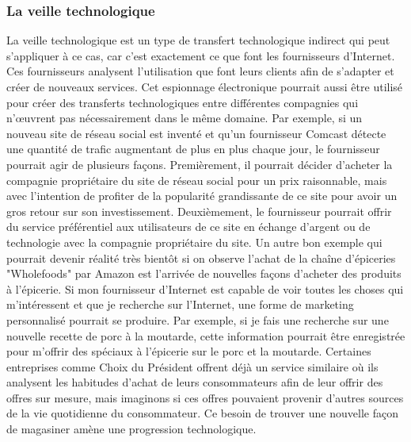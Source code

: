 \documentclass[12pt]{article}
\begin{document}
\subsubsection{La veille technologique}
La veille technologique est un type de transfert technologique indirect qui peut s’appliquer à ce cas, car c’est exactement ce que font les fournisseurs d’Internet. Ces fournisseurs analysent l’utilisation que font leurs clients afin de s’adapter et créer de nouveaux services. Cet espionnage électronique pourrait aussi être utilisé pour créer des transferts technologiques entre différentes compagnies qui n’œuvrent pas nécessairement dans le même domaine. Par exemple, si un nouveau site de réseau social est inventé et qu’un fournisseur Comcast détecte une quantité de trafic augmentant de plus en plus chaque jour, le fournisseur pourrait agir de plusieurs façons. Premièrement, il pourrait décider d’acheter la compagnie propriétaire du site de réseau social pour un prix raisonnable, mais avec l’intention de profiter de la popularité grandissante de ce site pour avoir un gros retour sur son investissement. Deuxièmement, le fournisseur pourrait offrir du service préférentiel aux utilisateurs de ce site en échange d’argent ou de technologie avec la compagnie propriétaire du site. Un autre bon exemple qui pourrait devenir réalité très bientôt si on observe l’achat de la chaîne d’épiceries "Wholefoods" par Amazon est l’arrivée de nouvelles façons d’acheter des produits à l’épicerie. Si mon fournisseur d’Internet est capable de voir toutes les choses qui m’intéressent et que je recherche sur l’Internet, une forme de marketing personnalisé pourrait se produire. Par exemple, si je fais une recherche sur une nouvelle recette de porc à la moutarde, cette information pourrait être enregistrée pour m’offrir des spéciaux à l’épicerie sur le porc et la moutarde. Certaines entreprises comme Choix du Président offrent déjà un service similaire où ils analysent les habitudes d’achat de leurs consommateurs afin de leur offrir des offres sur mesure, mais imaginons si ces offres pouvaient provenir d’autres sources de la vie quotidienne du consommateur. Ce besoin de trouver une nouvelle façon de magasiner amène une progression technologique.
\end{document}

